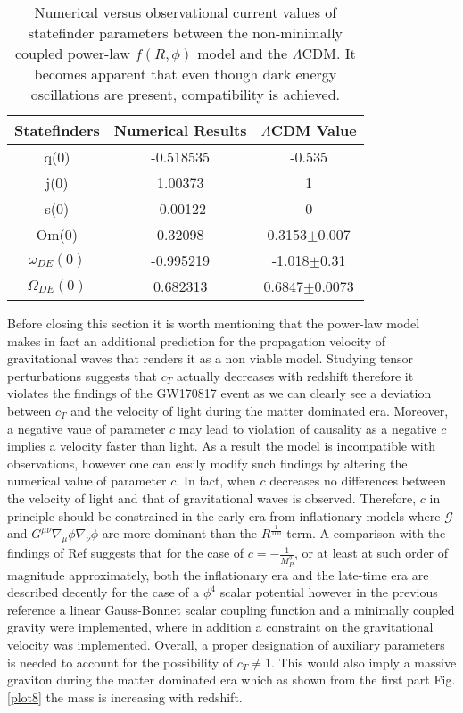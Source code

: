 \documentclass[aps,prd,twocolumn,groupedaddress,showpacs,nofootinbib,amssymb]{revtex4-2}
\begin{document}
\begin{table}
\centering
\begin{tabular}{|c|c|c|}\hline
Statefinders&Numerical Results& $\Lambda$CDM Value\\ \hline
q(0)&-0.518535&-0.535\\ \hline
j(0)&1.00373&1\\ \hline
s(0)&-0.00122&0\\ \hline
Om(0)&0.32098&0.3153$\pm$0.007\\ \hline
$\omega_{DE}(0)$&-0.995219&-1.018$\pm$0.31\\ \hline
$\Omega_{DE}(0)$&0.682313&0.6847$\pm0.0073$\\ \hline
\end{tabular}
\caption{Numerical versus observational current values of statefinder parameters between the non-minimally coupled power-law $f(R,\phi)$ model and the $\Lambda$CDM. It becomes apparent that even though dark energy oscillations are present, compatibility is achieved.}
\end{table}



Before closing this section it is worth mentioning that the power-law model makes in fact an additional prediction for the propagation velocity of gravitational waves that renders it as a non viable model. Studying tensor perturbations suggests that $c_T$ actually decreases with redshift therefore it violates the findings of the GW170817 event as we can clearly see a deviation between $c_T$ and the velocity of light during the matter dominated era. Moreover, a negative vaue of parameter $c$ may lead to violation of causality as a negative $c$ implies a velocity faster than light. As a result the model is incompatible with observations, however one can easily modify such findings by altering the numerical value of parameter $c$. In fact, when $c$ decreases no differences between the velocity of light and that of gravitational waves is observed. Therefore, $c$ in principle should be constrained in the early era from inflationary models where $\mathcal{G}$ and $G^{\mu\nu}\nabla_\mu\phi\nabla_\nu\phi$ are more dominant than the $R^{\frac{1}{100}}$ term. A comparison with the findings of Ref \cite{Oikonomou:2020tct} suggests that for the case of $c=-\frac{1}{M_P^2}$, or at least at such order of magnitude approximately, both the inflationary era and the late-time era are described decently for the case of a $\phi^4$ scalar potential however in the previous reference a linear Gauss-Bonnet scalar coupling function and a minimally coupled gravity were implemented, where in addition a constraint on the gravitational velocity was implemented. Overall, a proper designation of auxiliary parameters is needed to account for the possibility of $c_T\neq1$. This would also imply a massive graviton during the matter dominated era which as shown from the first part Fig.\ref{plot8} the mass is increasing with redshift.
\end{document}
